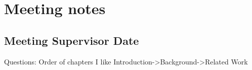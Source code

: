 \section*{Meeting notes}

\subsection*{Meeting Supervisor Date}
Questions: Order of chapters I like Introduction->Background->Related Work
